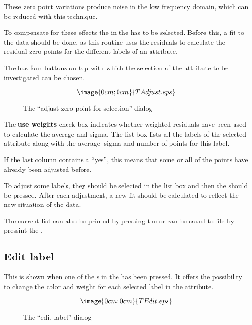 These zero point variations produce noise in the low frequency domain, which
can be reduced with this technique.

To compensate for these effects the  in the 
 has to be selected. Before this, a fit to the data should be
done, as this routine uses the residuals to calculate the residual
zero points for the different labels of an attribute.

The 
has four buttons on top with which the selection of the attribute 
to be investigated can be chosen.
\begin{figure}[h]
$$\image{0cm;0cm}{TAdjust.eps}$$%
\caption{The ``adjust zero point for selection'' dialog}%
\label{timestring.adjust.dialog}
\end{figure}

The {\bf use weights} check box indicates whether weighted residuals have been 
used to calculate the average and sigma.
The list box lists all the labels of the selected attribute along with the 
average, sigma and number of points for this label. 

If the last column
contains a ``yes'', this means that some or all of the points have already
been adjusted before.

To adjust some labels, they should be selected in the list box and then the 
 should be pressed.
After each adjustment, a new fit should be calculated to reflect the new 
situation of the data. 

The current list can also be printed by pressing the  
or can be saved to file by pressint the .


\subsection{Edit label}%
\label{timestring.edit}
This  
is shown when one of the %
s in the 
has been pressed. It offers the possibility
to change the color and weight
for each selected label in the attribute.
\begin{figure}[h]
$$\image{0cm;0cm}{TEdit.eps}$$%
\caption{The ``edit label'' dialog}%
\label{timestring.edit.dialog}
\end{figure}

